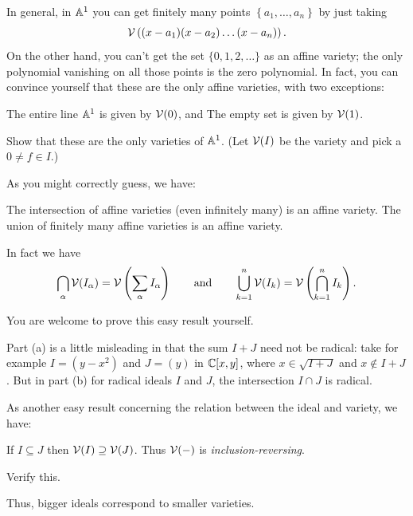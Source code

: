In general, in $\mathbb A^1$ you can get finitely
many points $\left\{ a_1, \dots, a_n \right\}$ by
just taking \[ \mathcal V\left( (x-a_1)(x-a_2)\dots(x-a_n) \right). \]
On the other hand, you can't get the set $\{0,1,2,\dots\}$ as an affine variety;
the only polynomial vanishing
on all those points is the zero polynomial.
In fact, you can convince yourself that these
are the only affine varieties, with two exceptions:
\begin{itemize}
	\ii The entire line $\mathbb A^1$ is given by $\mathcal V(0)$, and
	\ii The empty set is given by $\mathcal V(1)$.
\end{itemize}
\begin{exercise}
	Show that these are the only varieties of $\mathbb A^1$.
	(Let $\mathcal V(I)$ be the variety and pick a $0 \neq f \in I$.)
\end{exercise}

As you might correctly guess, we have:
\begin{theorem}
	\label{thm:many_aff_variety}
	\listhack
	\begin{enumerate}[(a)]
		\ii The intersection of affine varieties
		(even infinitely many) is an affine variety.
		\ii The union of finitely many affine varieties
		is an affine variety.
	\end{enumerate}
	In fact we have
	\[ \bigcap_\alpha \mathcal V(I_\alpha)
		= \mathcal V\left( \sum_\alpha I_\alpha \right)
		\qquad\text{and}\qquad
		\bigcup_{k=1}^n \mathcal V(I_k)
		= \mathcal V\left( \bigcap_{k=1}^n I_k \right). \]
\end{theorem}
You are welcome to prove this easy result yourself.
\begin{remark}
	Part (a) is a little misleading in that the sum $I+J$ need not be radical:
	take for example $I = (y-x^2)$ and $J = (y)$ in $\mathbb C[x,y]$,
	where $x \in \sqrt{I+J}$ and $x \notin I+J$.
	But in part (b) for radical ideals $I$ and $J$,
	the intersection $I \cap J$ is radical.
\end{remark}

As another easy result concerning the relation between the ideal and variety, we
have:
\begin{proposition}
	If $I \subseteq J$ then $\mathcal V(I) \supseteq \mathcal V(J)$.
	Thus $\mathcal V(-)$ is \emph{inclusion-reversing}.
\end{proposition}
\begin{ques}
	Verify this.
\end{ques}
Thus, bigger ideals correspond to smaller varieties.

